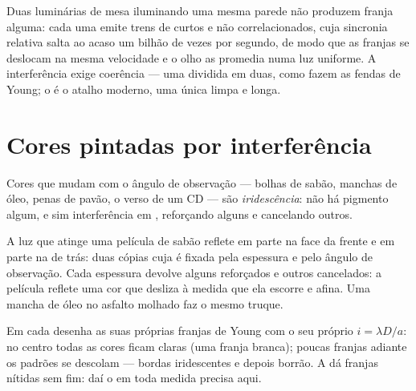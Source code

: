 \begin{remark}\label{rem:g12:light-as-wave:lamps}
Duas luminárias de mesa iluminando uma mesma parede não produzem franja
alguma: cada uma emite trens de  curtos e não correlacionados, cuja
sincronia relativa salta ao acaso um bilhão de vezes por segundo, de modo
que as franjas se deslocam na mesma velocidade e o olho as promedia numa
luz uniforme. A interferência exige coerência --- uma  dividida em
duas, como fazem as fendas de Young; o  é o atalho moderno, uma
única  limpa e longa.
\end{remark}

\section{Cores pintadas por interferência}

\begin{definition}[Iridescência]\label{def:g12:light-as-wave:iridescence}
Cores que mudam com o ângulo de observação --- bolhas de sabão, manchas
de óleo, penas de pavão, o verso de um CD --- são
\emph{iridescência}: não há pigmento algum, e sim
interferência em , reforçando alguns  e
cancelando outros.
\end{definition}

\begin{example}\label{ex:g12:light-as-wave:soap}
A luz que atinge uma película de sabão reflete em parte na face da frente
e em parte na de trás: duas cópias  cuja  é
fixada pela espessura e pelo ângulo de observação. Cada espessura
devolve alguns  reforçados e outros cancelados: a
película reflete uma cor que desliza à medida que ela escorre e afina.
Uma mancha de óleo no asfalto molhado faz o mesmo truque.
\end{example}

\begin{remark}\label{rem:g12:light-as-wave:white}
Em  cada  desenha as suas próprias franjas
de Young com o seu próprio $i = \lambda D/a$: no centro todas as cores
ficam claras (uma franja branca); poucas franjas adiante os padrões se
descolam --- bordas iridescentes e depois borrão. A  dá
franjas nítidas sem fim: daí o  em toda medida precisa aqui.
\end{remark}

